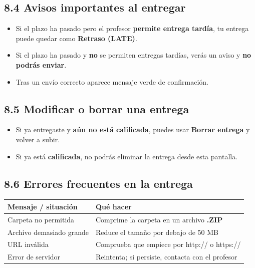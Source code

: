 \documentclass[
  spanish,
  11pt,
]{report}
\newcounter{none} %
\providecommand{\tightlist}{%
  \setlength{\itemsep}{0pt}\setlength{\parskip}{0pt}}
\begin{document}
\subsection{8.4 Avisos importantes al
entregar}\label{avisos-importantes-al-entregar}

\begin{itemize}
\tightlist
\item
  Si el plazo ha pasado pero el profesor \textbf{permite entrega
  tardía}, tu entrega puede quedar como \textbf{Retraso (LATE)}.
\item
  Si el plazo ha pasado y \textbf{no} se permiten entregas tardías,
  verás un aviso y \textbf{no podrás enviar}.
\item
  Tras un envío correcto aparece mensaje verde de confirmación.
\end{itemize}

\subsection{8.5 Modificar o borrar una
entrega}\label{modificar-o-borrar-una-entrega}

\begin{itemize}
\tightlist
\item
  Si ya entregaste y \textbf{aún no está calificada}, puedes usar
  \textbf{Borrar entrega} y volver a subir.
\item
  Si ya está \textbf{calificada}, no podrás eliminar la entrega desde
  esta pantalla.
\end{itemize}

\subsection{8.6 Errores frecuentes en la
entrega}\label{errores-frecuentes-en-la-entrega}

{\def\LTcaptype{none} %
\begin{longtable}[]{@{}ll@{}}
\toprule\noalign{}
Mensaje / situación & Qué hacer \\
\midrule\noalign{}
\endhead
\bottomrule\noalign{}
\endlastfoot
Carpeta no permitida & Comprime la carpeta en un archivo
\textbf{.ZIP} \\
Archivo demasiado grande & Reduce el tamaño por debajo de 50 MB \\
URL inválida & Comprueba que empiece por http:// o https:// \\
Error de servidor & Reintenta; si persiste, contacta con el profesor \\
\end{longtable}
}
\end{document}
